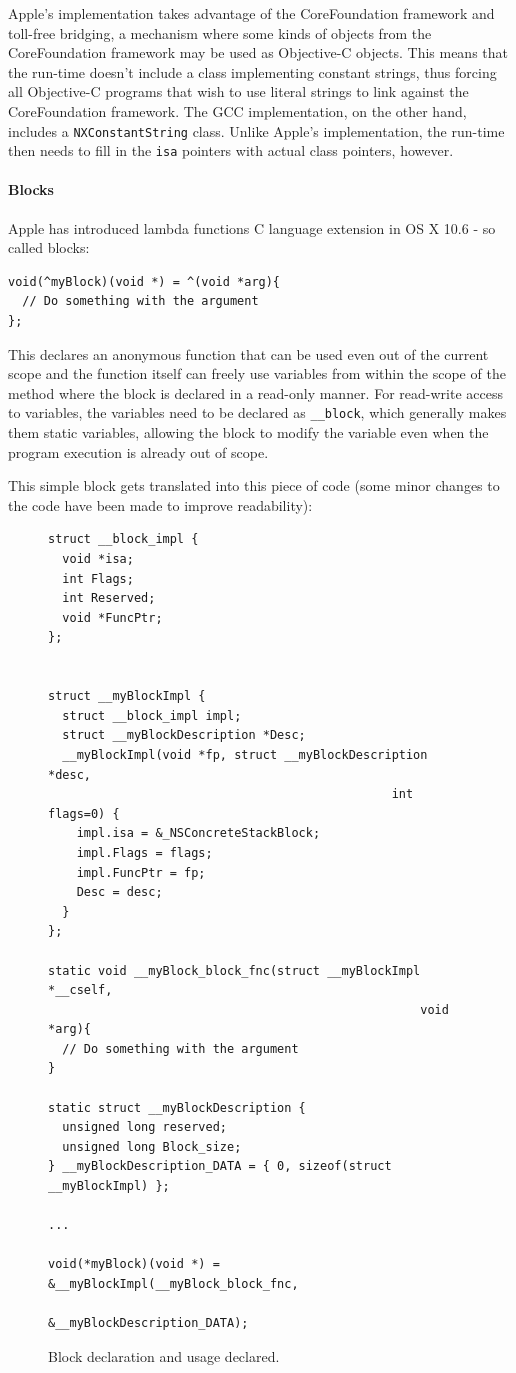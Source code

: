 Apple's implementation takes advantage of the CoreFoundation framework and toll-free bridging, a mechanism where some kinds of objects from the CoreFoundation framework may be used as Objective-C objects. This means that the run-time doesn't include a class implementing constant strings, thus forcing all Objective-C programs that wish to use literal strings to link against the CoreFoundation framework. The GCC implementation, on the other hand, includes a \verb=NXConstantString= class. Unlike Apple's implementation, the run-time then needs to fill in the \verb=isa= pointers with actual class pointers, however.

\paragraph{Blocks}

Apple has introduced lambda functions C language extension in OS X 10.6 - so called blocks:

\begin{verbatim}
void(^myBlock)(void *) = ^(void *arg){
  // Do something with the argument
};
\end{verbatim}

This declares an anonymous function that can be used even out of the current scope and the function itself can freely use variables from within the scope of the method where the block is declared in a read-only manner. For read-write access to variables, the variables need to be declared as \verb=__block=, which generally makes them static variables, allowing the block to modify the variable even when the program execution is already out of scope.

This simple block gets translated into this piece of code (some minor changes to the code have been made to improve readability):

\begin{figure}[H]
\begin{verbatim}
struct __block_impl {
  void *isa;
  int Flags;
  int Reserved;
  void *FuncPtr;
};


struct __myBlockImpl {
  struct __block_impl impl;
  struct __myBlockDescription *Desc;
  __myBlockImpl(void *fp, struct __myBlockDescription *desc, 
                                                int flags=0) {
    impl.isa = &_NSConcreteStackBlock;
    impl.Flags = flags;
    impl.FuncPtr = fp;
    Desc = desc;
  }
};

static void __myBlock_block_fnc(struct __myBlockImpl *__cself, 
                                                    void *arg){
  // Do something with the argument
}

static struct __myBlockDescription {
  unsigned long reserved;
  unsigned long Block_size;
} __myBlockDescription_DATA = { 0, sizeof(struct __myBlockImpl) };

...

void(*myBlock)(void *) = &__myBlockImpl(__myBlock_block_fnc, 
                                      &__myBlockDescription_DATA);

\end{verbatim}
  \centering{}
  \caption{Block declaration and usage declared.}
  \label{fig:block_compiled}
\end{figure}

